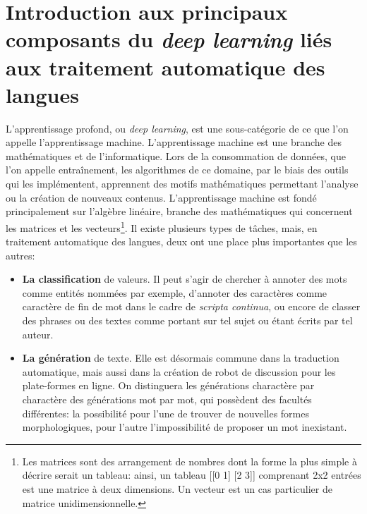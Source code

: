 \section{Introduction aux principaux composants du \textit{deep learning} liés aux traitement automatique des langues}

L'apprentissage profond, ou \textit{deep learning}, est une sous-catégorie de ce que l'on appelle l'apprentissage machine. L'apprentissage machine est une branche des mathématiques et de l'informatique. Lors de la consommation de données, que l'on appelle entraînement, les algorithmes de ce domaine, par le biais des outils qui les implémentent, apprennent des motifs mathématiques permettant l'analyse ou la création de nouveaux contenus. L'apprentissage machine est fondé principalement sur l'algèbre linéaire, branche des mathématiques qui concernent les matrices et les vecteurs\footnote{Les matrices sont des arrangement de nombres dont la forme la plus simple à décrire serait un tableau: ainsi, un tableau [[0 1] [2 3]] comprenant 2x2 entrées est une matrice à deux dimensions. Un vecteur est un cas particulier de matrice unidimensionnelle.}. Il existe plusieurs types de tâches, mais, en traitement automatique des langues, deux ont une place plus importantes que les autres:

\begin{itemize}
    \item \textbf{La classification} de valeurs. Il peut s'agir de chercher à annoter des mots comme entités nommées par exemple, d'annoter des caractères comme caractère de fin de mot dans le cadre de \textit{scripta continua}, ou encore de classer des phrases ou des textes comme portant sur tel sujet ou étant écrits par tel auteur.
    \item \textbf{La génération} de texte. Elle est désormais commune dans la traduction automatique, mais aussi dans la création de robot de discussion pour les plate-formes en ligne. On distinguera les générations charactère par charactère des générations mot par mot, qui possèdent des facultés différentes: la possibilité pour l'une de trouver de nouvelles formes morphologiques, pour l'autre l'impossibilité de proposer un mot inexistant.
\end{itemize}{}

